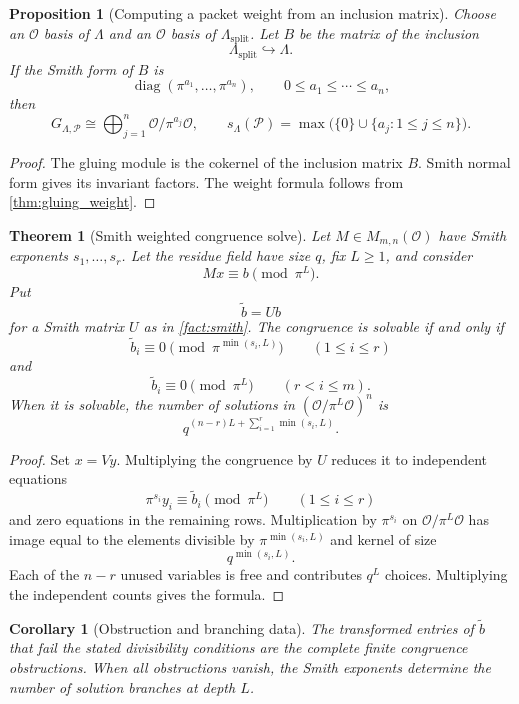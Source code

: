 \documentclass[11pt,a4paper]{article}
\newtheorem{theorem}{Theorem}[section]
\newtheorem{proposition}[proposition]{Proposition}
\newtheorem{corollary}[corollary]{Corollary}
\theoremstyle{definition}
\theoremstyle{remark}
\newcommand{\OO}{\mathcal O}
\newcommand{\Pcal}{\mathcal P}
\newcommand{\diag}{\operatorname{diag}}
\providecommand{\diag}{\operatorname{diag}}
\providecommand{\OO}{\mathcal O}
\theoremstyle{definition}\newtheorem{construction}[theorem]{Construction}\newtheorem{certificate}[theorem]{Numerical Certificate}
\theoremstyle{remark}\newtheorem{boundary}[theorem]{Boundary}
\begin{document}
\begin{proposition}[Computing a packet weight from an inclusion matrix]\label{prop:weight_from_inclusion}
Choose an $\OO$ basis of $\Lambda$ and an $\OO$ basis of $\Lambda_{\mathrm{split}}$.  Let $B$ be the matrix of the inclusion
\[
\Lambda_{\mathrm{split}}\hookrightarrow\Lambda.
\]
If the Smith form of $B$ is
\[
\diag(\pi^{a_1},\ldots,\pi^{a_n}),
\qquad
0\leq a_1\leq\cdots\leq a_n,
\]
then
\[
G_{\Lambda,\Pcal}
\cong
\bigoplus_{j=1}^n\OO/\pi^{a_j}\OO,
\qquad
s_\Lambda(\Pcal)=\max\bigl(\{0\}\cup\{a_j:1\leq j\leq n\}\bigr).
\]
\end{proposition}

\begin{proof}
The gluing module is the cokernel of the inclusion matrix $B$.  Smith normal form gives its invariant factors.  The weight formula follows from \cref{thm:gluing_weight}.
\end{proof}

\begin{theorem}[Smith weighted congruence solve]\label{thm:smith_congruence}
Let $M\in M_{m,n}(\OO)$ have Smith exponents $s_1,\ldots,s_r$.  Let the residue field have size $q$, fix $L\geq1$, and consider
\[
Mx\equiv b\pmod{\pi^L}.
\]
Put
\[
\widetilde b=Ub
\]
for a Smith matrix $U$ as in \cref{fact:smith}.  The congruence is solvable if and only if
\[
\widetilde b_i\equiv0
\pmod{\pi^{\min(s_i,L)}}
\qquad(1\leq i\leq r)
\]
and
\[
\widetilde b_i\equiv0
\pmod{\pi^L}
\qquad(r<i\leq m).
\]
When it is solvable, the number of solutions in $(\OO/\pi^L\OO)^n$ is
\[
\boxed{
q^{(n-r)L+\sum_{i=1}^r\min(s_i,L)}.
}
\]
\end{theorem}

\begin{proof}
Set $x=Vy$.  Multiplying the congruence by $U$ reduces it to independent equations
\[
\pi^{s_i}y_i\equiv\widetilde b_i\pmod{\pi^L}
\qquad(1\leq i\leq r)
\]
and zero equations in the remaining rows.  Multiplication by $\pi^{s_i}$ on $\OO/\pi^L\OO$ has image equal to the elements divisible by $\pi^{\min(s_i,L)}$ and kernel of size
\[
q^{\min(s_i,L)}.
\]
Each of the $n-r$ unused variables is free and contributes $q^L$ choices.  Multiplying the independent counts gives the formula.
\end{proof}

\begin{corollary}[Obstruction and branching data]\label{cor:smith_obstruction}
The transformed entries of $\widetilde b$ that fail the stated divisibility conditions are the complete finite congruence obstructions.  When all obstructions vanish, the Smith exponents determine the number of solution branches at depth $L$.
\end{corollary}
\end{document}
